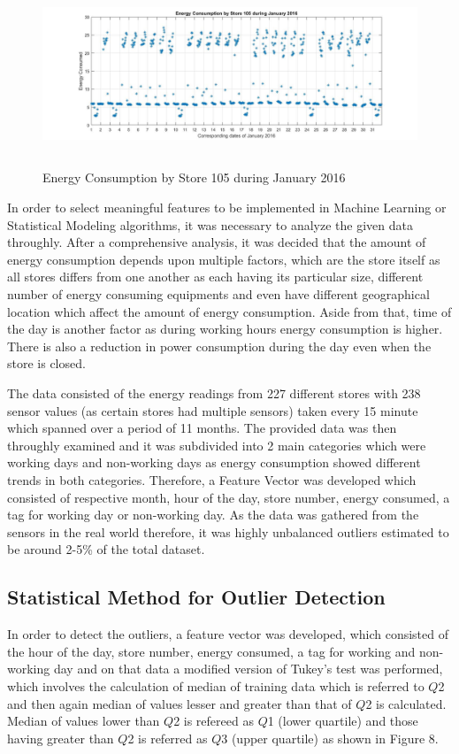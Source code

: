 \documentclass[conference]{IEEEtran}
\begin{document}
\begin{figure}[h]
	\centering
	\includegraphics[width=13cm,height=5.5cm]{store_105_jan.jpg}
	\caption{Energy Consumption by Store 105 during January 2016}
	\label{fig:store_105_nov}
\end{figure}

In order to select meaningful features to be implemented in Machine Learning
or Statistical Modeling algorithms, it was necessary to analyze the given data throughly. After a comprehensive analysis, it was decided that the amount of energy
consumption depends upon multiple factors, which are the store itself as
all stores differs from one another as each having its particular size, different
number of energy consuming equipments and even have different geographical
location which affect the amount of energy consumption. Aside from that,
time of the day is another factor as during working hours energy consumption
is higher. There is also a reduction in power consumption during the day even when the store is closed.

The data consisted of the energy readings from 227 different stores with 238 sensor values (as certain stores had multiple sensors) taken every 15 minute which spanned over a period of 11 months. The provided data was then throughly examined and it was subdivided into 2 main categories which were working days and non-working days as energy consumption showed different trends in both categories. Therefore, a Feature Vector was developed which consisted of respective month, hour of the day, store number, energy consumed, a tag for working day or non-working day. As the data was gathered from the sensors in the real world therefore, it was highly unbalanced  outliers estimated to be around 2-5\% of the total dataset.


\subsection{\label{sec:level2}	Statistical Method for Outlier Detection}
In order to detect the outliers, a feature vector was developed, which consisted of the hour of the day, store number, energy consumed, a tag for working and non-working day and on that data a modified version of Tukey's test \cite{bb31} was performed, which involves the calculation of median of training data which is referred to $\mathit{Q}$2 and then again median of values lesser and greater than that of $\mathit{Q}$2  is calculated. Median of values lower than $\mathit{Q}$2  is refereed as $\mathit{Q}$1  (lower quartile) and those having greater than $\mathit{Q}$2 is referred as $\mathit{Q}$3  (upper quartile) as shown in Figure 8. 
\end{document}
